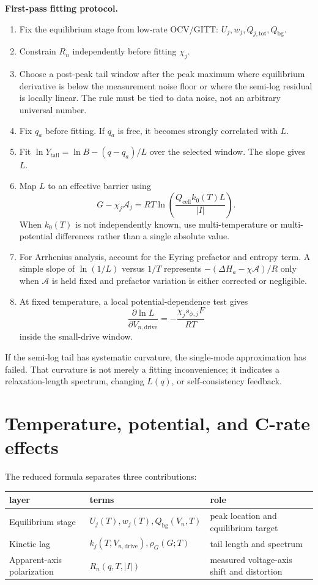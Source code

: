 \documentclass[11pt,a4paper]{article}
\newcommand{\drive}{\mathrm{drive}}
\newcommand{\bg}{\mathrm{bg}}
\newcommand{\cell}{\mathrm{cell}}
\newcommand{\tot}{\mathrm{tot}}
\newcommand{\tail}{\mathrm{tail}}
\begin{document}
\textbf{First-pass fitting protocol.}
\begin{enumerate}[label=\textbf{F\arabic*.},leftmargin=2.4em]
\item Fix the equilibrium stage from low-rate OCV/GITT: $U_j,w_j,Q_{j,\tot},Q_{\bg}$.
\item Constrain $R_n$ independently before fitting $\chi_j$.
\item Choose a post-peak tail window after the peak maximum where equilibrium derivative is below the measurement noise floor or where the
      semi-log residual is locally linear. The rule must be tied to data noise, not an arbitrary universal number.
\item Fix $q_a$ before fitting. If $q_a$ is free, it becomes strongly correlated with $L$.
\item Fit $\ln Y_{\tail}=\ln B-(q-q_a)/L$ over the selected window. The slope gives $L$.
\item Map $L$ to an effective barrier using
\begin{equation}
G-\chi_j\mathcal A_j=RT\ln\left(\frac{Q_{\cell}k_0(T)L}{|I|}\right).
\label{eq:barrier_from_L}
\end{equation}
When $k_0(T)$ is not independently known, use multi-temperature or multi-potential differences rather than a single absolute value.
\item For Arrhenius analysis, account for the Eyring prefactor and entropy term. A simple slope of $\ln(1/L)$ versus $1/T$ represents
      $-(\Delta H_a-\chi\mathcal A)/R$ only when $\mathcal A$ is held fixed and prefactor variation is either corrected or negligible.
\item At fixed temperature, a local potential-dependence test gives
\begin{equation}
\frac{\partial\ln L}{\partial V_{n,\drive}}=-\frac{\chi_js_{\phi,j}F}{RT}
\label{eq:chi_slope}
\end{equation}
inside the small-drive window.
\end{enumerate}

If the semi-log tail has systematic curvature, the single-mode approximation has failed. That curvature is not merely a fitting inconvenience;
it indicates a relaxation-length spectrum, changing $L(q)$, or self-consistency feedback.

\section{Temperature, potential, and C-rate effects}\label{sec:falsify}
The reduced formula separates three contributions:
\begin{longtable}{p{} p{} p{}}
\toprule layer & terms & role \\ \midrule \endhead
Equilibrium stage & $U_j(T),w_j(T),Q_{\bg}(V_n,T)$ & peak location and equilibrium target \\
Kinetic lag & $k_j(T,V_{n,\drive}),\rho_G(G;T)$ & tail length and spectrum \\
Apparent-axis polarization & $R_n(q,T,|I|)$ & measured voltage-axis shift and distortion \\
\bottomrule
\end{longtable}
\end{document}
